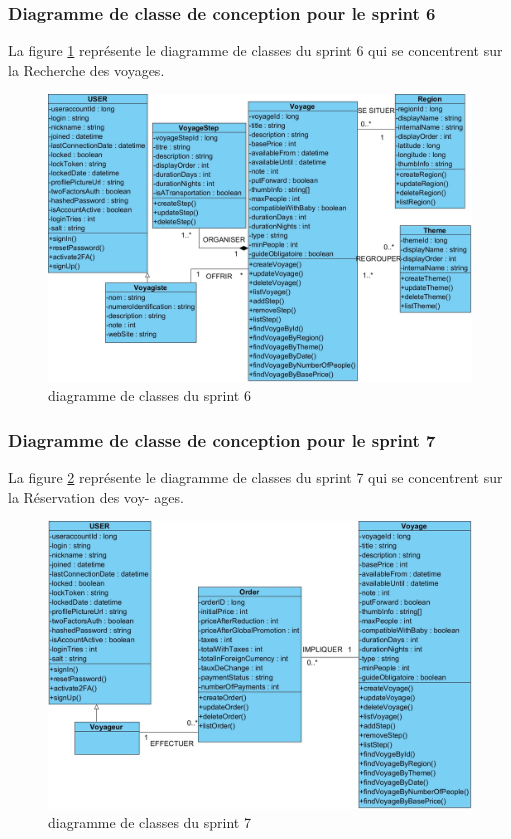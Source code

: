 \documentclass[12pt]{report}
\begin{document}
			\subsubsection{Diagramme de classe de conception pour le sprint 6}
				
			\hspace{15pt} La figure \ref{fig:sprint6} représente le diagramme de classes du sprint 6 qui se concentrent sur la Recherche des
voyages.


			\begin{figure}[h]
				\centering
				\includegraphics[width=\textwidth]{sprint6.jpg}
				\caption{diagramme de classes du sprint 6}
				\label{fig:sprint6}
			\end{figure}
			\FloatBarrier

			\subsubsection{Diagramme de classe de conception pour le sprint 7}
				
			\hspace{15pt} La figure \ref{fig:sprint7} représente le diagramme de classes du sprint 7 qui se concentrent sur la Réservation des voy-
ages.


			\begin{figure}[h]
				\centering
				\includegraphics[width=\textwidth]{sprint7.jpg}
				\caption{diagramme de classes du sprint 7}
				\label{fig:sprint7}
			\end{figure}
			\FloatBarrier
\end{document}
